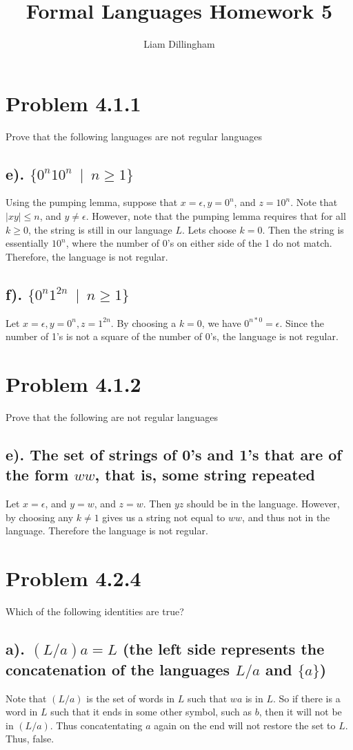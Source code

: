 \documentclass[20pt]{article} %
\title{Formal Languages Homework 5}
\author{Liam Dillingham}
\begin{document}
\maketitle

\section{Problem 4.1.1}
Prove that the following languages are not regular languages
\subsection{e). $\{0^{n}10^{n} \ \mid \ n\geq1\}$}
Using the pumping lemma, suppose that $x=\epsilon, y=0^{n}$, and $z=10^{n}$.  Note that $|xy| \leq n$, and $y \neq \epsilon$.  However, note that the pumping lemma requires that for all $k \geq 0$, the string is still in our language $L$.  Lets choose $k=0$.  Then the string is essentially $10^{n}$, where the number of 0's on either side of the 1 do not match.  Therefore, the language is not regular.
\subsection{f). $\{0^{n}1^{2n} \ \mid \ n\geq1\}$}
Let $x=\epsilon, y = 0^{n}, z=1^{2n}$. By choosing a $k=0$, we have $0^{n*0}=\epsilon$.  Since the number of 1's is not a square of the number of 0's, the language is not regular.

\section{Problem 4.1.2}
Prove that the following are not regular languages
\subsection{e). The set of strings of 0's and 1's that are of the form $ww$, that is, some string repeated}
Let $x=\epsilon$, and $y=w$, and $z=w$.  Then $yz$ should be in the language. However, by choosing any $k \neq 1$ gives us a string not equal to $ww$, and thus not in the language.  Therefore the language is not regular.

\newpage
\section{Problem 4.2.4}
Which of the following identities are true?
\subsection{a). $(L/a)a=L$ (the left side represents the concatenation of the languages $L/a$ and $\{a\}$)}
Note that $(L/a)$ is the set of words in $L$ such that $wa$ is in $L$.  So if there is a word in $L$ such that it ends in some other symbol, such as $b$, then it will not be in $(L/a)$.  Thus concatentating $a$ again on the end will not restore the set to $L$.  Thus, false.
\end{document}
